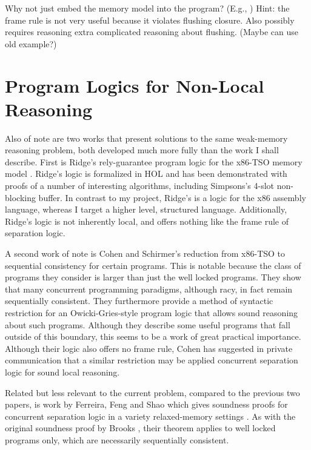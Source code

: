 \documentclass[11pt]{report}
\begin{document}
Why not just embed the memory model into the program? (E.g., \cite{DBLP:conf/tphol/Ridge07}) Hint: the frame rule is not very useful because it violates flushing closure. Also possibly requires reasoning extra complicated reasoning about flushing.  (Maybe can use old example?)


\section{Program Logics for Non-Local Reasoning}

Also of note are two works that present solutions to the same weak-memory reasoning problem, both developed much more fully than the work I shall describe. First is Ridge's rely-guarantee program logic for the x86-TSO memory model \cite{DBLP:conf/vstte/Ridge10}. Ridge's logic is formalized in HOL and has been demonstrated with proofs of a number of interesting algorithms, including Simpsons's 4-slot non-blocking buffer. In contrast to my project, Ridge's is a logic for the x86 assembly language, whereas I target a higher level, structured language. Additionally, Ridge's logic is not inherently local, and offers nothing like the frame rule of separation logic. 

A second work of note is Cohen and Schirmer's \cite{DBLP:conf/itp/CohenS10} reduction from x86-TSO to sequential consistency for certain programs. This is notable because the class of programs they consider is larger than just the well locked programs. They show that many concurrent programming paradigms, although racy, in fact remain sequentially consistent. They furthermore provide a method of syntactic restriction for an Owicki-Gries-style program logic that allows sound reasoning about such programs. Although they describe some useful programs that fall outside of this boundary, this seems to be a work of great practical importance. Although their logic also offers no frame rule, Cohen has suggested in private communication that a similar restriction may be applied concurrent separation logic for sound local reasoning.

Related but less relevant to the current problem, compared to the previous two papers, is work by Ferreira, Feng and Shao which gives soundness proofs for concurrent separation logic in a variety relaxed-memory settings \cite{DBLP:conf/esop/FerreiraFS10}. As with the original soundness proof by Brooks \cite{DBLP:journals/tcs/Brookes07}, their theorem applies to well locked programs only, which are necessarily sequentially consistent. 
\end{document}
